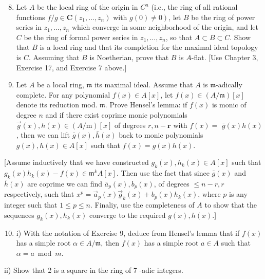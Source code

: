 \documentclass{standalone}
\theoremstyle{definition}
\theoremstyle{remark}
\begin{document}
\begin{enumerate}
  \setcounter{enumi}{7}
  \item Let $A$ be the local ring of the origin in $C^{n}$ (i.e., the ring of all rational functions $f / g \in \mathbf{C}\left(z_{1}, \ldots, z_{n}\right)$ with $\left.g(0) \neq 0\right)$, let $B$ be the ring of power series in $z_{1}, \ldots, z_{n}$ which converge in some neighborhood of the origin, and let $C$ be the ring of formal power series in $z_{1}, \ldots, z_{n}$, so that $A \subset B \subset C$. Show that $B$ is a local ring and that its completion for the maximal ideal topology is $C$. Assuming that $B$ is Noetherian, prove that $B$ is $A$-flat. [Use Chapter 3, Exercise 17, and Exercise 7 above.]

  \item Let $A$ be a local ring, $\mathfrak{m}$ its maximal ideal. Assume that $A$ is $\mathfrak{m}$-adically complete. For any polynomial $f(x) \in A[x]$, let $f(x) \in(A / \mathfrak{m})[x]$ denote its reduction mod. $\mathfrak{m}$. Prove Hensel's lemma: if $f(x)$ is monic of degree $n$ and if there exist coprime monic polynomials $\vec{g}(x), h(x) \in(A / \mathrm{m})[x]$ of degrees $r, n-\boldsymbol{r}$ with $f(x)=$ $\bar{g}(x) h(x)$, then we can lift $\bar{g}(x), \bar{h}(x)$ back to monic polynomials $g(x), h(x) \in A[x]$ such that $f(x)=g(x) h(x)$.

\end{enumerate}

[Assume inductively that we have constructed $g_{k}(x), h_{k}(x) \in A[x]$ such that $g_{k}(x) h_{k}(x)-f(x) \in \mathfrak{m}^{k} A[x]$. Then use the fact that since $\bar{g}(x)$ and $\bar{h}(x)$ are coprime we can find $\bar{a}_{p}(x), b_{p}(x)$, of degrees $\leqslant n-r, r$ respectively, such that $x^{p}=\vec{a}_{p}(x) \vec{g}_{k}(x)+b_{p}(x) h_{k}(x)$, where $p$ is any integer such that $1 \leqslant p \leqslant n$. Finaliy, use the completeness of $A$ to show that the sequences $g_{k}(x), h_{k}(x)$ converge to the required $g(x), h(x)$.]

\begin{enumerate}
  \setcounter{enumi}{9}
  \item i) With the notation of Exercise 9, deduce from Hensel's lemma that if $f(x)$ has a simple root $\alpha \in A / \mathfrak{m}$, then $f(x)$ has a simple root $a \in A$ such that $\alpha=a \bmod m$.
\end{enumerate}

ii) Show that 2 is a square in the ring of 7 -adic integers.
\end{document}
